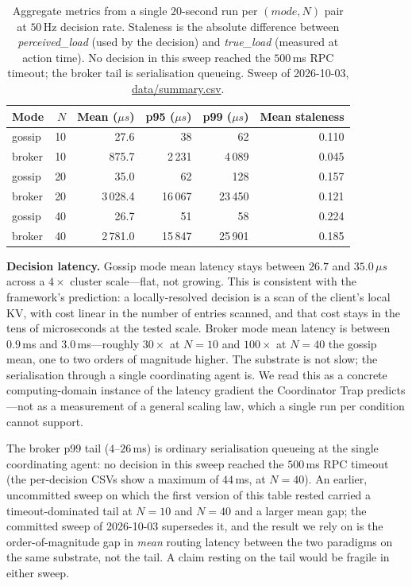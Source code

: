\documentclass[11pt]{article}
\theoremstyle{definition}
\theoremstyle{plain}
\theoremstyle{plain}
\begin{document}
\begin{table}[!ht]
\centering
\small
\begin{tabular}{lrrrrr}
\toprule
\textbf{Mode} & \textbf{$N$} & \textbf{Mean ($\mu s$)} & \textbf{p95 ($\mu s$)} & \textbf{p99 ($\mu s$)} & \textbf{Mean staleness} \\
\midrule
gossip & 10 &     27.6 &     38 &     62 & 0.110 \\
broker & 10 &    875.7 &  2\,231 &  4\,089 & 0.045 \\
gossip & 20 &     35.0 &     62 &    128 & 0.157 \\
broker & 20 &  3\,028.4 & 16\,067 & 23\,450 & 0.121 \\
gossip & 40 &     26.7 &     51 &     58 & 0.224 \\
broker & 40 &  2\,781.0 & 15\,847 & 25\,901 & 0.185 \\
\bottomrule
\end{tabular}
\caption{Aggregate metrics from a single $20$-second run per $(mode, N)$ pair
at $50$\,Hz decision rate. Staleness is the absolute difference between
\emph{perceived\_load} (used by the decision) and \emph{true\_load}
(measured at action time). No decision in this sweep reached the $500$\,ms RPC
timeout; the broker tail is serialisation queueing. Sweep of 2026-10-03,
\url{data/summary.csv}.}
\label{tab:empirical}
\end{table}

\textbf{Decision latency.} Gossip mode mean latency stays between $26.7$ and
$35.0$\,$\mu s$ across a $4\times$ cluster scale---flat, not growing. This is consistent with
the framework's prediction: a locally-resolved decision is a scan of the
client's local KV, with cost linear in the number of entries scanned, and
that cost stays in the tens of microseconds at the tested scale. Broker
mode mean latency is between $0.9$\,ms and $3.0$\,ms---roughly $30\times$ at
$N{=}10$ and $100\times$ at $N{=}40$ the gossip mean, one to two orders of
magnitude higher. The substrate is not slow; the serialisation
through a single coordinating agent is. We read this as a concrete computing-domain
instance of the latency gradient the Coordinator Trap predicts---not as a measurement
of a general scaling law, which a single run per condition cannot support.

The broker p99 tail ($4$--$26$\,ms) is ordinary serialisation queueing at the
single coordinating agent: no decision in this sweep reached the $500$\,ms RPC
timeout (the per-decision CSVs show a maximum of $44$\,ms, at $N{=}40$). An
earlier, uncommitted sweep on which the first version of this table rested carried
a timeout-dominated tail at $N{=}10$ and $N{=}40$ and a larger mean gap; the
committed sweep of 2026-10-03 supersedes it, and the result we rely on is the
order-of-magnitude gap in \emph{mean} routing latency between the two paradigms on
the same substrate, not the tail. A claim resting on the tail would be fragile in
either sweep.
\end{document}
